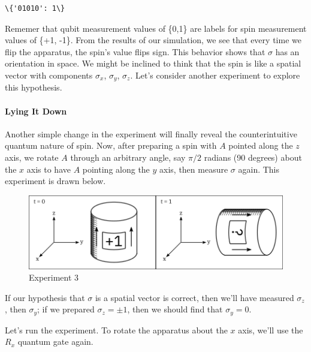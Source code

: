\documentclass[11pt]{article}
\makeatletter
\def\maxwidth{\ifdim\Gin@nat@width>\linewidth\linewidth
    \else\Gin@nat@width\fi}
\let\Oldincludegraphics\includegraphics
\renewcommand{\includegraphics}[1]{\Oldincludegraphics[width=.8\maxwidth]{#1}}
\makeatother
\begin{document}
    \begin{Verbatim}[commandchars=\\\{\}]
\{'01010': 1\}

    \end{Verbatim}

    Rememer that qubit measurement values of \{0,1\} are labels for spin
measurement values of \{+1, -1\}. From the results of our simulation, we
see that every time we flip the apparatus, the spin's value flips sign.
This behavior shows that \(\sigma\) has an orientation in space. We
might be inclined to think that the spin is like a spatial vector with
components \(\sigma_x\), \(\sigma_y\), \(\sigma_z\). Let's consider
another experiment to explore this hypothesis.

    \hypertarget{lying-it-down}{%
\paragraph{Lying It Down}\label{lying-it-down}}

    Another simple change in the experiment will finally reveal the
counterintuitive quantum nature of spin. Now, after preparing a spin
with \(A\) pointed along the \(z\) axis, we rotate \(A\) through an
arbitrary angle, say \(\pi/2\) radians (90 degrees) about the \(x\) axis
to have \(A\) pointing along the \(y\) axis, then measure \(\sigma\)
again. This experiment is drawn below.

\begin{figure}
\centering
\includegraphics{img/statesAndMeasurements_03.png}
\caption{Experiment 3}
\end{figure}

If our hypothesis that \(\sigma\) is a spatial vector is correct, then
we'll have measured \(\sigma_z\), then \(\sigma_y\); if we prepared
\(\sigma_z = \pm 1\), then we should find that \(\sigma_y = 0\).

Let's run the experiment. To rotate the apparatus about the \(x\) axis,
we'll use the \(R_x\) quantum gate again.
\end{document}
